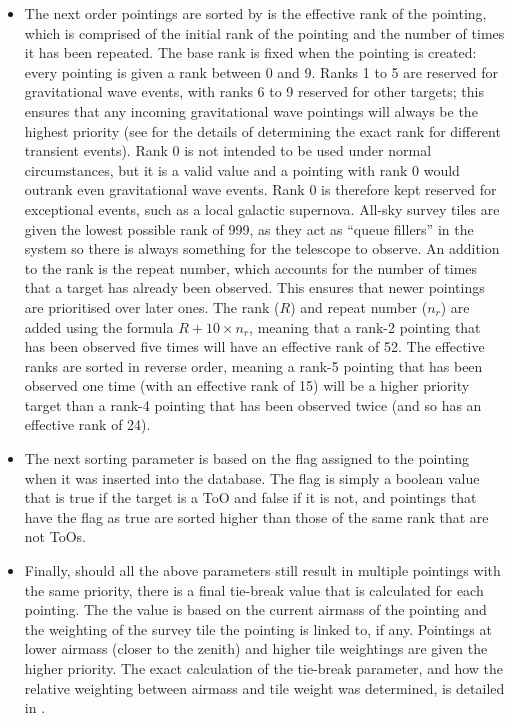 \begin{colsection}
\begin{colsection}
\begin{itemize}
\item The next order pointings are sorted by is the effective rank of the pointing, which is comprised of the initial rank of the pointing and the number of times it has been repeated. The base rank is fixed when the pointing is created: every pointing is given a rank between 0 and 9. Ranks 1 to 5 are reserved for gravitational wave events, with ranks 6 to 9 reserved for other targets; this ensures that any incoming gravitational wave pointings will always be the highest priority (see  for the details of determining the exact rank for different transient events). Rank 0 is not intended to be used under normal circumstances, but it is a valid value and a pointing with rank 0 would outrank even gravitational wave events. Rank 0 is therefore kept reserved for exceptional events, such as a local galactic supernova. All-sky survey tiles are given the lowest possible rank of 999, as they act as ``queue fillers'' in the system so there is always something for the telescope to observe. An addition to the rank is the repeat number, which accounts for the number of times that a target has already been observed. This ensures that newer pointings are prioritised over later ones. The rank ($R$) and repeat number ($n_r$) are added using the formula $R + 10\times n_r$, meaning that a rank-2 pointing that has been observed five times will have an effective rank of 52. The effective ranks are sorted in reverse order, meaning a rank-5 pointing that has been observed one time (with an effective rank of 15) will be a higher priority target than a rank-4 pointing that has been observed twice (and so has an effective rank of 24).

\item The next sorting parameter is based on the  flag assigned to the pointing when it was inserted into the database. The flag is simply a boolean value that is true if the target is a ToO and false if it is not, and pointings that have the flag as true are sorted higher than those of the same rank that are not ToOs.

\item Finally, should all the above parameters still result in multiple pointings with the same priority, there is a final tie-break value that is calculated for each pointing. The the value is based on the current airmass of the pointing and the weighting of the survey tile the pointing is linked to, if any. Pointings at lower airmass (closer to the zenith) and higher tile weightings are given the higher priority. The exact calculation of the tie-break parameter, and how the relative weighting between airmass and tile weight was determined, is detailed in .


\end{itemize}
\end{colsection}
\end{colsection}
